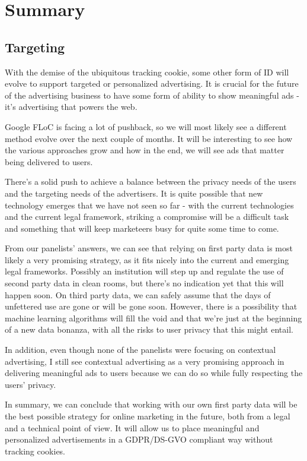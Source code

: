 %
%

\pagebreak
\section{Summary}

\onehalfspacing

\subsection{Targeting}

With the demise of the ubiquitous tracking cookie, some other form of ID will evolve to support targeted or personalized advertising. It is crucial for the future of the advertising business to have some form of ability to show meaningful ads - it's advertising that powers the web.

Google FLoC is facing a lot of pushback, so we will most likely see a different method evolve over the next couple of months. It will be interesting to see how the various approaches grow and how in the end, we will see ads that matter being delivered to users.

There's a solid push to achieve a balance between the privacy needs of the users and the targeting needs of the advertisers. It is quite possible that new technology emerges that we have not seen so far - with the current technologies and the current legal framework, striking a compromise will be a difficult task and something that will keep marketeers busy for quite some time to come.

From our panelists' answers, we can see that relying on first party data is most likely a very promising strategy, as it fits nicely into the current and emerging legal frameworks. Possibly an institution will step up and regulate the use of second party data in clean rooms, but there's no indication yet that this will happen soon. On third party data, we can safely assume that the days of unfettered use are gone or will be gone soon. However, there is a possibility that machine learning algorithms will fill the void and that we're just at the beginning of a new data bonanza, with all the risks to user privacy that this might entail.

In addition, even though none of the panelists were focusing on contextual advertising, I still see contextual advertising as a very promising approach in delivering meaningful ads to users because we can do so while fully respecting the users' privacy.

In summary, we can conclude that working with our own first party data will be the best possible strategy for online marketing in the future, both from a legal and a technical point of view. It will allow us to place meaningful and personalized advertisements in a GDPR/DS-GVO compliant way without tracking cookies.

